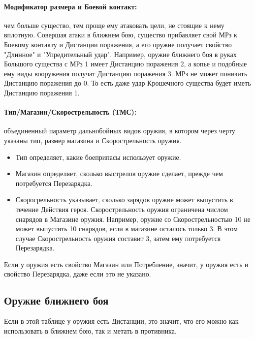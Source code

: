 \paragraph{Модификатор размера и Боевой контакт:} чем больше существо, тем проще ему атаковать цели, не стоящие к нему вплотную. Совершая атаки в ближнем бою, существо прибавляет свой МРз к Боевому контакту и Дистанции поражения, а его оружие получает свойство "Длинное" и "Упредительный удар". Например, оружие ближнего боя в руках Большого существа с МРз 1 имеет Дистанцию поражения 2, а копье и подобные ему виды вооружения получат Дистанцию поражения 3. МРз не может понизить Дистанцию поражения до 0. То есть даже удар Крошечного существа будет иметь Дистанцию поражения 1.

\paragraph{Тип/Магазин/Скорострельность (ТМС):} объединенный параметр дальнобойных видов оружия, в котором через черту указаны тип, размер магазина и Скорострельность оружия.
\begin{itemize}
    \item Тип определяет, какие боеприпасы использует оружие.
    \item Магазин определяет, сколько выстрелов оружие сделает, прежде чем потребуется Перезарядка.
    \item Скоросрельность указывает, сколько зарядов оружие может выпустить в течение Действия героя. Скорострельность оружия ограничена числом снарядов в Магазине оружия. Например, оружие со Скорострельностью 10 не может выпустить 10 снарядов, если в магазине осталось только 3. В этом случае Скорострельность оружия составит 3, затем ему потребуется Перезарядка.
\end{itemize}
\begin{tcolorbox}
    Если у оружия есть свойство Магазин или Потребление, значит, у оружия есть и свойство Перезарядка, даже если это не указано.
\end{tcolorbox}




\newpage
\subsection{Оружие ближнего боя}
Если в этой таблице у оружия есть Дистанции, это значит, что его можно как использовать в ближнем бою, так и метать в противника.

